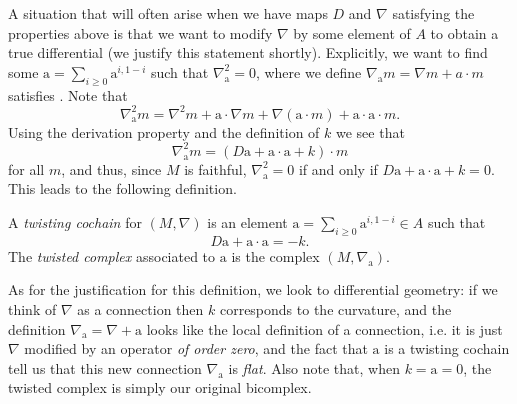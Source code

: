 \documentclass[11pt,notitlepage]{article}
\numberwithin{equation}{subsection}
\begin{document}
                A situation that will often arise when we have maps $D$ and $\nabla$ satisfying the properties above is that we want to modify $\nabla$ by some element of $A$ to obtain a true differential (we justify this statement shortly).
                Explicitly, we want to find some $\mathrm{a}=\sum_{i\geqslant0}\mathrm{a}^{i,1-i}$ such that $\nabla_\mathrm{a}^2=0$, where we define $\nabla_\mathrm{a}m = \nabla m+a\cdot m$ satisfies .
                Note that
                \[
                    \nabla_\mathrm{a}^2m = \nabla^2m+\mathrm{a}\cdot\nabla m+\nabla(\mathrm{a}\cdot m)+\mathrm{a}\cdot\mathrm{a}\cdot m.
                \]
                Using the derivation property and the definition of $k$ we see that
                \[
                    \nabla_\mathrm{a}^2m = (D\mathrm{a}+\mathrm{a}\cdot\mathrm{a}+k)\cdot m
                \]
                for all $m$, and thus, since $M$ is faithful, $\nabla_\mathrm{a}^2=0$ if and only if $D\mathrm{a}+\mathrm{a}\cdot\mathrm{a}+k=0$.
                This leads to the following definition.
                \begin{definition}
                    A \textit{twisting cochain} for $(M,\nabla)$ is an element $\mathrm{a}=\sum_{i\geqslant0}\mathrm{a}^{i,1-i}\in A$ such that
                    \[
                        D\mathrm{a}+\mathrm{a}\cdot\mathrm{a}=-k.
                    \]
                    The \textit{twisted complex} associated to $\mathrm{a}$ is the complex $(M,\nabla_\mathrm{a})$.
                \end{definition}

                As for the justification for this definition, we look to differential geometry: if we think of $\nabla$ as a connection then $k$ corresponds to the curvature, and the definition $\nabla_\mathrm{a}=\nabla+\mathrm{a}$ looks like the local definition of a connection, i.e. it is just $\nabla$ modified by an operator \textit{of order zero}, and the fact that $\mathrm{a}$ is a twisting cochain tell us that this new connection $\nabla_\mathrm{a}$ is \textit{flat}.
                Also note that, when $k=\mathrm{a}=0$, the twisted complex is simply our original bicomplex.

                \bigskip
\end{document}
